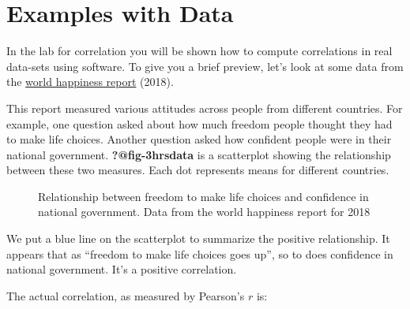 \documentclass[
  letterpaper,
  DIV=11,
  numbers=noendperiod]{scrreprt}
\begin{document}
\section{Examples with Data}\label{examples-with-data}

In the lab for correlation you will be shown how to compute correlations
in real data-sets using software. To give you a brief preview, let's
look at some data from the \href{http://worldhappiness.report}{world
happiness report} (2018).

This report measured various attitudes across people from different
countries. For example, one question asked about how much freedom people
thought they had to make life choices. Another question asked how
confident people were in their national government.
\textbf{?@fig-3hrsdata} is a scatterplot showing the relationship
between these two measures. Each dot represents means for different
countries.

\begin{figure}


\caption{\label{fig-3hsrdata}Relationship between freedom to make life
choices and confidence in national government. Data from the world
happiness report for 2018}

\end{figure}%

We put a blue line on the scatterplot to summarize the positive
relationship. It appears that as ``freedom to make life choices goes
up'', so to does confidence in national government. It's a positive
correlation.

The actual correlation, as measured by Pearson's \(r\) is:
\end{document}
